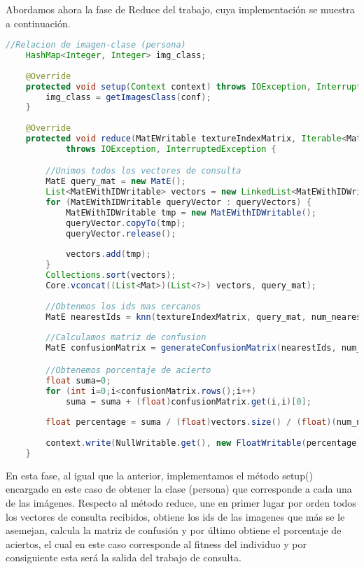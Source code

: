 Abordamos ahora la fase de Reduce del trabajo, cuya implementación se muestra a continuación.

 \begin{lstlisting}[language=Java]
	//Relacion de imagen-clase (persona)
	HashMap<Integer, Integer> img_class;
	
	@Override
	protected void setup(Context context) throws IOException, InterruptedException {
		img_class = getImagesClass(conf);
	}
	
	@Override
	protected void reduce(MatEWritable textureIndexMatrix, Iterable<MatEWithIDWritable> queryVectors, Context context)
			throws IOException, InterruptedException {

		//Unimos todos los vectores de consulta
		MatE query_mat = new MatE();
		List<MatEWithIDWritable> vectors = new LinkedList<MatEWithIDWritable>();
		for (MatEWithIDWritable queryVector : queryVectors) {
			MatEWithIDWritable tmp = new MatEWithIDWritable();
			queryVector.copyTo(tmp);
			queryVector.release();
			
			vectors.add(tmp);
		}
		Collections.sort(vectors);
		Core.vconcat((List<Mat>)(List<?>) vectors, query_mat);
		
		//Obtenmos los ids mas cercanos
		MatE nearestIds = knn(textureIndexMatrix, query_mat, num_nearest);
		
		//Calculamos matriz de confusion		
		MatE confusionMatrix = generateConfusionMatrix(nearestIds, num_nearest);

		//Obtenemos porcentaje de acierto
		float suma=0;
		for (int i=0;i<confusionMatrix.rows();i++)
			suma = suma + (float)confusionMatrix.get(i,i)[0];
		
		float percentage = suma / (float)vectors.size() / (float)(num_nearest - 1);
		
		context.write(NullWritable.get(), new FloatWritable(percentage));
	}
\end{lstlisting}

En esta fase, al igual que la anterior, implementamos el método setup() encargado en este caso de obtener la clase (persona) que corresponde a cada una de las imágenes. Respecto al método reduce, une en primer lugar por orden todos los vectores de consulta recibidos, obtiene los ids de las imagenes que m\'as se le asemejan, calcula la matriz de confusi\'on y por \'ultimo obtiene el porcentaje de aciertos, el cual en este caso corresponde al fitness del individuo y por consiguiente esta ser\'a la salida del trabajo de consulta.













